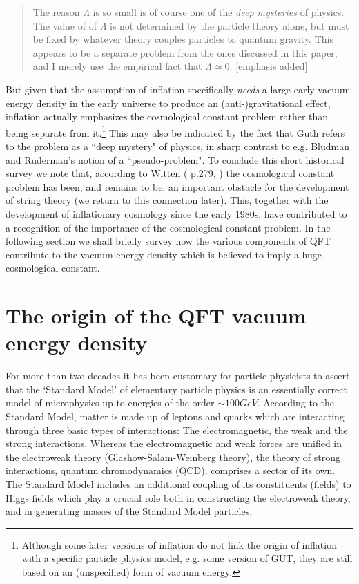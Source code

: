 \documentclass[12pt]{article}
\def\s{\section}
\begin{document}
\begin{quote}
The reason $\Lambda$ is so small is of course one of the {\em deep
mysteries} of physics. The value of of $\Lambda$ is not determined
by the particle theory alone, but must be fixed by whatever theory
couples particles to quantum gravity. This appears to be a 
separate problem from the ones discussed in this paper, and I 
merely use the empirical fact that $\Lambda \simeq 0$.
[emphasis added]
\end{quote}

But given that the assumption of inflation specifically {\em
needs} a large early vacuum energy density in the early universe
to produce an (anti-)gravitational effect, inflation actually
emphasizes the cosmological constant problem rather than being
separate from it.\footnote{Although some later versions of
inflation do not link the origin of inflation with a specific
particle physics model, e.g. some version of GUT, they are still
based on an (unspecified) form of vacuum energy.} This may also be
indicated by the fact that Guth refers to the problem as a ``deep
mystery" of physics, in sharp contrast to e.g. Bludman and
Ruderman's notion of a ``pseudo-problem". To conclude this short
historical survey we note that, according to Witten
(\cite{witten97} p.279, \cite{witten00}) the cosmological constant
problem has been, and remains to be, an important obstacle for the
development of string theory (we return to this connection later).
This, together with the development of inflationary cosmology
since the early 1980s, have contributed to a recognition of the
importance of the cosmological constant problem. In the following
section we shall briefly survey how the various components of QFT
contribute to the vacuum energy density which is believed to
imply a huge cosmological constant.


\s{The origin of the QFT vacuum energy density}   

For more than two decades it has been customary for particle
physicists to assert that the `Standard Model' of elementary particle
physics is an essentially correct model of microphysics up to energies
of the order $\sim 100 GeV$.  According to the Standard Model, matter
is made up of leptons and quarks which are interacting through three
basic types of interactions: The electromagnetic, the weak and the
strong interactions.  Whereas the electromagnetic and weak forces are
unified in the electroweak theory (Glashow-Salam-Weinberg theory), the
theory of strong interactions, quantum chromodynamics (QCD), comprises
a sector of its own.  The Standard Model includes an additional
coupling of its constituents (fields) to Higgs fields which play a
crucial role both in constructing the electroweak theory, and in
generating masses of the Standard Model particles.
\end{document}
